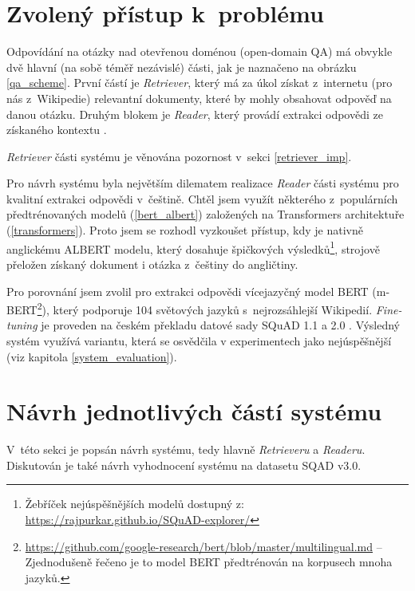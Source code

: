 \section{Zvolený přístup k~problému}
Odpovídání na otázky nad otevřenou doménou (open-domain QA) má obvykle dvě hlavní (na sobě téměř nezávislé) části, jak je naznačeno na obrázku \ref{qa_scheme}. První částí je \emph{Retriever}, který má za úkol získat z~internetu (pro nás z~Wikipedie) relevantní dokumenty, které by mohly obsahovat odpověď na danou otázku. Druhým blokem je \emph{Reader}, který provádí extrakci odpovědi ze získaného kontextu \cite{drQA}.\par
\noindent\emph{Retriever} části systému je věnována pozornost v~sekci \ref{retriever_imp}.\par
Pro návrh systému byla největším dilematem realizace \emph{Reader} části systému pro kvalitní extrakci odpovědi v~češtině. Chtěl jsem využít některého z~populárních předtrénovaných modelů (\ref{bert_albert}) založených na Transformers \cite{Transformers} architektuře (\ref{transformers}). Proto jsem se rozhodl vyzkoušet přístup, kdy je nativně anglickému ALBERT modelu, který dosahuje špičkových výsledků\footnote{Žebříček nejúspěšnějších modelů dostupný z: \url{https://rajpurkar.github.io/SQuAD-explorer/}}, strojově přeložen získaný dokument i otázka z~češtiny do angličtiny.\par
Pro porovnání jsem zvolil pro extrakci odpovědi vícejazyčný model BERT (m-BERT\footnote{\url{https://github.com/google-research/bert/blob/master/multilingual.md} -- Zjednodušeně řečeno je to model BERT předtrénován na korpusech mnoha jazyků.}), který podporuje 104 světových jazyků s~nejrozsáhlejší Wikipedií. \emph{Fine-tuning} je proveden na českém překladu datové sady SQuAD 1.1 a 2.0 \cite{czech_squad} \cite{squad}. Výsledný systém využívá variantu, která se osvědčila v experimentech jako nejúspěšnější (viz kapitola \ref{system_evaluation}).\par

\section{Návrh jednotlivých částí systému}
\label{design}
V~této sekci je popsán návrh systému, tedy hlavně \emph{Retrieveru} a \emph{Readeru}. Diskutován je také návrh vyhodnocení systému na datasetu SQAD v3.0.


